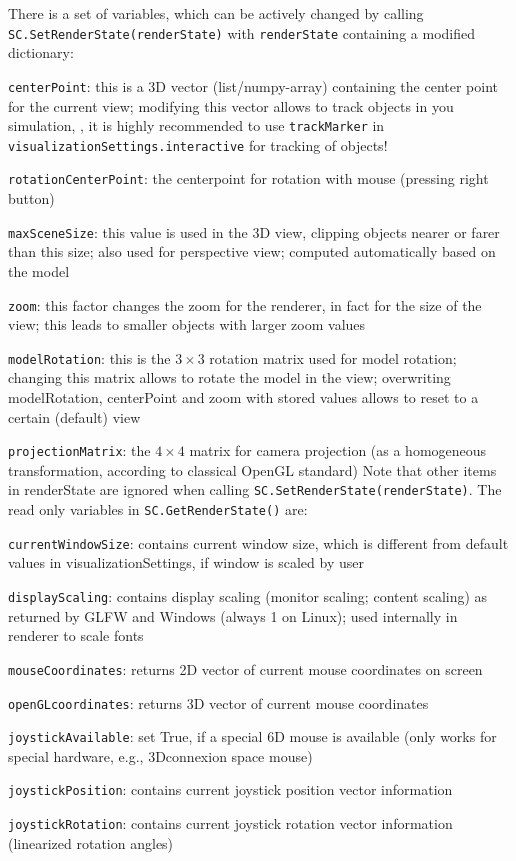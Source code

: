 There is a set of variables, which can be actively changed by calling  \texttt{SC.SetRenderState(renderState)} with \texttt{renderState}
containing a modified dictionary:
\bi
  \item \texttt{centerPoint}: this is a 3D vector (list/numpy-array) containing the center point for the current view; modifying this vector allows to track objects in you simulation, , it is highly recommended to use \texttt{trackMarker} in \texttt{visualizationSettings.interactive} for tracking of objects!
  \item \texttt{rotationCenterPoint}: the centerpoint for rotation with mouse (pressing right button)
  \item \texttt{maxSceneSize}: this value is used in the 3D view, clipping objects nearer or farer than this size; also used for perspective view; computed automatically based on the model
  \item \texttt{zoom}: this factor changes the zoom for the renderer, in fact for the size of the view; this leads to smaller objects with larger zoom values
  \item \texttt{modelRotation}: this is the $3 \times 3$ rotation matrix used for model rotation; changing this matrix allows to rotate the model in the view; overwriting modelRotation, centerPoint and zoom with stored values allows to reset to a certain (default) view
  \item \texttt{projectionMatrix}: the $4 \times 4$ matrix for camera projection (as a homogeneous transformation, according to classical OpenGL standard)
\ei
Note that other items in renderState are ignored when calling \texttt{SC.SetRenderState(renderState)}. The read only variables in \texttt{SC.GetRenderState()} are:
\bi
  \item \texttt{currentWindowSize}: contains current window size, which is different from default values in visualizationSettings, if window is scaled by user
  \item \texttt{displayScaling}: contains display scaling (monitor scaling; content scaling) as returned by GLFW and Windows (always 1 on Linux); used internally in renderer to scale fonts
  \item \texttt{mouseCoordinates}: returns 2D vector of current mouse coordinates on screen
  \item \texttt{openGLcoordinates}: returns 3D vector of current mouse coordinates
  \item \texttt{joystickAvailable}: set True, if a special 6D mouse is available (only works for special hardware, e.g., 3Dconnexion space mouse)
  \item \texttt{joystickPosition}: contains current joystick position vector information 
  \item \texttt{joystickRotation}: contains current joystick rotation vector information (linearized rotation angles)
\ei


